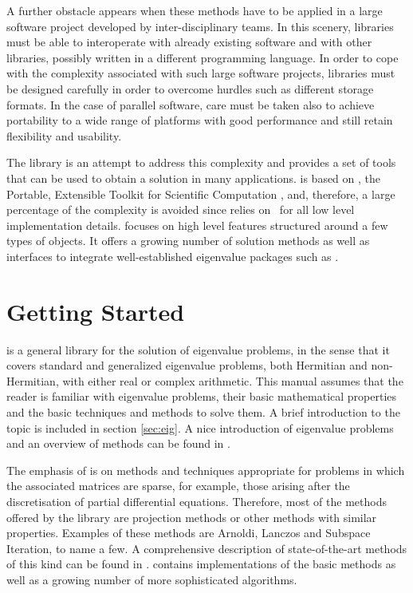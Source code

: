 	A further obstacle appears when these methods have to be applied in a large software project developed by inter-disciplinary teams. In this scenery, libraries must be able to interoperate with already existing software and with other libraries, possibly written in a different programming language. In order to cope with the complexity associated with such large software projects, libraries must be designed carefully in order to overcome hurdles such as different storage formats. In the case of parallel software, care must be taken also to achieve portability to a wide range of platforms with good performance and still retain flexibility and usability. 

	The \slepc library is an attempt to address this complexity and provides a set of tools that can be used to obtain a solution in many applications. \slepc is based on \petsc, the Portable, Extensible Toolkit for Scientific Computation \citep{Balay:2002:PUM}, and, therefore, a large percentage of the complexity is avoided since \slepc relies on \petsc\ for all low level implementation details. \slepc focuses on high level features structured around a few types of objects. It offers a growing number of solution methods as well as interfaces to integrate well-established eigenvalue packages such as \arpack.

\section{Getting Started}

	\slepc is a general library for the solution of eigenvalue problems, in the sense that it covers standard and generalized eigenvalue problems, both Hermitian and non-Hermitian, with either real or complex arithmetic. This manual assumes that the reader is familiar with eigenvalue problems, their basic mathematical properties and the basic techniques and methods to solve them. A brief introduction to the topic is included in section \ref{sec:eig}. A nice introduction of eigenvalue problems and an overview of methods can be found in \citep{Golub:2000:EC2}.
	
	The emphasis of \slepc is on methods and techniques appropriate for problems in which the associated matrices are sparse, for example, those arising after the discretisation of partial differential equations. Therefore, most of the methods offered by the library are projection methods or other methods with similar properties. Examples of these methods are Arnoldi, Lanczos and Subspace Iteration, to name a few. A comprehensive description of state-of-the-art methods of this kind can be found in \citep{Bai:2000:TSA}. \slepc contains implementations of the basic methods as well as a growing number of more sophisticated algorithms.


